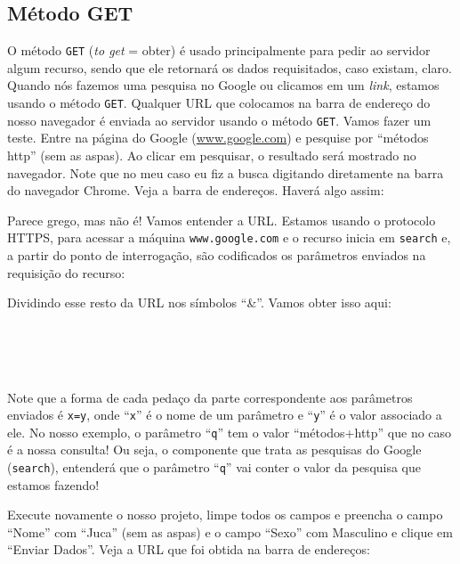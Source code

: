 \subsection{Método GET}

O método \texttt{GET} (\textit{to get} = obter) é usado principalmente para pedir ao servidor algum recurso, sendo que ele retornará os dados requisitados, caso existam, claro. Quando nós fazemos uma pesquisa no Google ou clicamos em um \textit{link}, estamos usando o método \texttt{GET}. Qualquer URL que colocamos na barra de endereço do nosso navegador é enviada ao servidor usando o método \texttt{GET}. Vamos fazer um teste. Entre na página do Google (\url{www.google.com}) e pesquise por ``métodos http'' (sem as aspas). Ao clicar em pesquisar, o resultado será mostrado no navegador. Note que no meu caso eu fiz a busca digitando diretamente na barra do navegador Chrome. Veja a barra de endereços. Haverá algo assim:


Parece grego, mas não é! Vamos entender a URL. Estamos usando o protocolo HTTPS, para acessar a máquina \texttt{www.google.com} e o recurso inicia em \texttt{search} e, a partir do ponto de interrogação, são codificados os parâmetros enviados na requisição do recurso:


Dividindo esse resto da URL nos símbolos ``\&''. Vamos obter isso aqui:

\\
\\
\\

Note que a forma de cada pedaço da parte correspondente aos parâmetros enviados é \texttt{x=y}, onde ``\texttt{x}'' é o nome de um parâmetro e ``\texttt{y}'' é o valor associado a ele. No nosso exemplo, o parâmetro ``\texttt{q}'' tem o valor ``métodos+http'' que no caso é a nossa consulta! Ou seja, o componente que trata as pesquisas do Google (\texttt{search}), entenderá que o parâmetro ``\texttt{q}'' vai conter o valor da pesquisa que estamos fazendo!

Execute novamente o nosso projeto, limpe todos os campos e preencha o campo ``Nome'' com ``Juca'' (sem as aspas) e o campo ``Sexo'' com Masculino e clique em ``Enviar Dados''. Veja a URL que foi obtida na barra de endereços:


